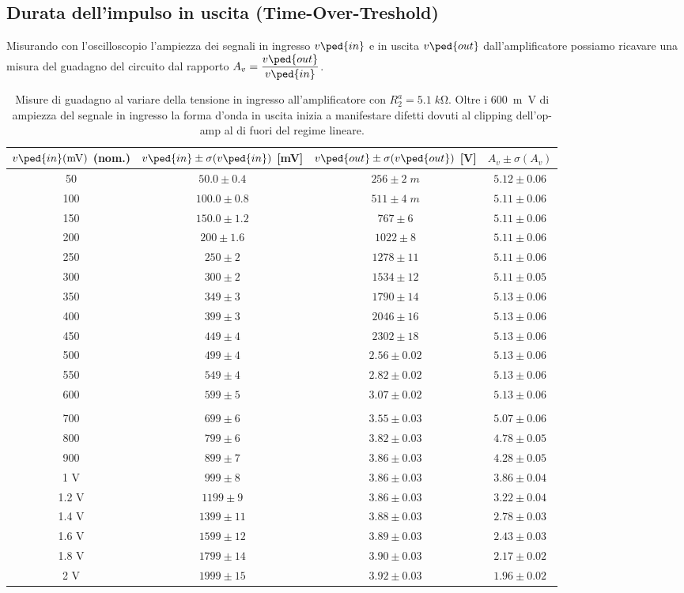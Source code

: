 \documentclass[10pt,a4paper]{article}
\begin{document}
\subsection{Durata dell'impulso in uscita (Time-Over-Treshold)}
Misurando con l'oscilloscopio l'ampiezza dei segnali in ingresso $v\ped{in}$
e in uscita $v\ped{out}$ dall'amplificatore possiamo ricavare una misura del
guadagno del circuito dal rapporto $A_v = \dfrac{v\ped{out}}{v\ped{in}}$.
\begin{table}[htbp]
\centering
\begin{tabular}{cccc}
\toprule
$v\ped{in}(\si{m\V})$ (nom.) & $v\ped{in} \pm \sigma(v\ped{in})$ [mV] & $v\ped{out} \pm \sigma(v\ped{out})$ [V] & $A_v \pm \sigma(A_v)$ \\
\midrule
\midrule
50 & $50.0 \pm 0.4$ & $256 \pm 2 \; \si{m}$ & $5.12 \pm 0.06$ \\
100 & $100.0 \pm 0.8$ & $511 \pm 4 \; \si{m}$ & $5.11 \pm 0.06$ \\
150 & $150.0 \pm 1.2$ & $767 \pm 6$ & $5.11 \pm 0.06$ \\
200 & $200 \pm 1.6$ & $1022 \pm 8$ & $5.11 \pm 0.06$ \\
250 & $250 \pm 2$ & $1278 \pm 11$ & $5.11 \pm 0.06$ \\
300 & $300 \pm 2$ & $1534 \pm 12$ & $5.11 \pm 0.05$ \\
350 & $349 \pm 3$ & $1790 \pm 14$ & $5.13 \pm 0.06$ \\
400 & $399 \pm 3$ & $2046 \pm 16$ & $5.13 \pm 0.06$ \\
450 & $449 \pm 4$ & $2302 \pm 18$ & $5.13 \pm 0.06$ \\
500 & $499 \pm 4$ & $2.56 \pm 0.02$ & $5.13 \pm 0.06$ \\
550 & $549 \pm 4$ & $2.82 \pm 0.02$ & $5.13 \pm 0.06$ \\
600 & $599 \pm 5$ & $3.07 \pm 0.02$ & $5.13 \pm 0.06$ \\
\\
700 & $699 \pm 6$ & $3.55 \pm 0.03$ & $5.07 \pm 0.06$ \\
800 & $799 \pm 6$ & $3.82 \pm 0.03$ & $4.78 \pm 0.05$ \\
900 & $899 \pm 7$ & $3.86 \pm 0.03$ & $4.28 \pm 0.05$ \\
1 V & $999 \pm 8$ & $3.86 \pm 0.03$ & $3.86 \pm 0.04$ \\
1.2 V & $1199 \pm 9$ & $3.86 \pm 0.03$ & $3.22 \pm 0.04$ \\
1.4 V & $1399 \pm 11$ & $3.88 \pm 0.03$ & $2.78 \pm 0.03$ \\
1.6 V & $1599 \pm 12$ & $3.89 \pm 0.03$ & $2.43 \pm 0.03$ \\
1.8 V & $1799 \pm 14$ & $3.90 \pm 0.03$ & $2.17 \pm 0.02$ \\
2 V & $1999 \pm 15$ & $3.92 \pm 0.03$ & $1.96 \pm 0.02$ \\
\bottomrule
\end{tabular} 
\caption{Misure di guadagno al variare della tensione in ingresso
all'amplificatore con $R_2^a = 5.1 \; \si{k\ohm}$. Oltre i \SI{600}{m\V} di
ampiezza del segnale in ingresso la forma d'onda in uscita inizia a
manifestare difetti dovuti al clipping dell'op-amp al di fuori del regime
lineare. \label{tab: gain_B}}
\end{table}
\end{document}

